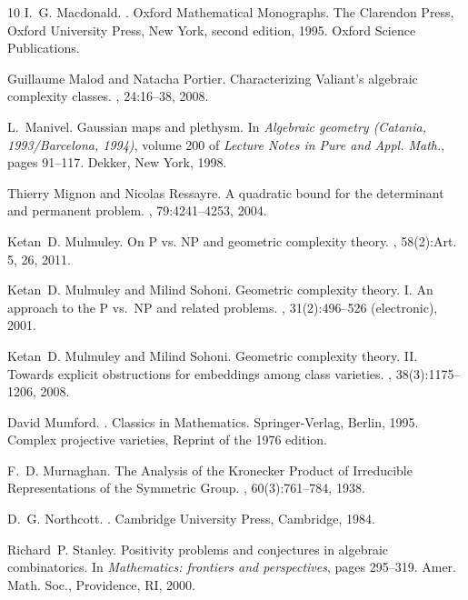 \documentclass[11pt]{amsart}
\numberwithin{equation}{section}
\begin{document}
\begin{thebibliography}{10}
I.~G. Macdonald.
.
\newblock Oxford Mathematical Monographs. The Clarendon Press, Oxford
  University Press, New York, second edition, 1995.
\newblock Oxford Science Publications.

Guillaume Malod and Natacha Portier.
\newblock Characterizing {V}aliant's algebraic complexity classes.
, 24:16--38, 2008.

L.~Manivel.
\newblock Gaussian maps and plethysm.
\newblock In {\em Algebraic geometry ({C}atania, 1993/{B}arcelona, 1994)},
  volume 200 of {\em Lecture Notes in Pure and Appl. Math.}, pages 91--117.
  Dekker, New York, 1998.

Thierry Mignon and Nicolas Ressayre.
\newblock A quadratic bound for the determinant and permanent problem.
, 79:4241--4253, 2004.

Ketan~D. Mulmuley.
\newblock On {P} vs. {NP} and geometric complexity theory.
, 58(2):Art. 5, 26, 2011.

Ketan~D. Mulmuley and Milind Sohoni.
\newblock Geometric complexity theory. {I}. {A}n approach to the {P} vs.\ {NP}
  and related problems.
, 31(2):496--526 (electronic), 2001.

Ketan~D. Mulmuley and Milind Sohoni.
\newblock Geometric complexity theory. {II}. {T}owards explicit obstructions
  for embeddings among class varieties.
, 38(3):1175--1206, 2008.

David Mumford.
.
\newblock Classics in Mathematics. Springer-Verlag, Berlin, 1995.
\newblock Complex projective varieties, Reprint of the 1976 edition.

F.~D. Murnaghan.
\newblock The {A}nalysis of the {K}ronecker {P}roduct of {I}rreducible
  {R}epresentations of the {S}ymmetric {G}roup.
, 60(3):761--784, 1938.

D.~G. Northcott.
.
\newblock Cambridge University Press, Cambridge, 1984.

Richard~P. Stanley.
\newblock Positivity problems and conjectures in algebraic combinatorics.
\newblock In {\em Mathematics: frontiers and perspectives}, pages 295--319.
  Amer. Math. Soc., Providence, RI, 2000.


\end{thebibliography}
\end{document}
